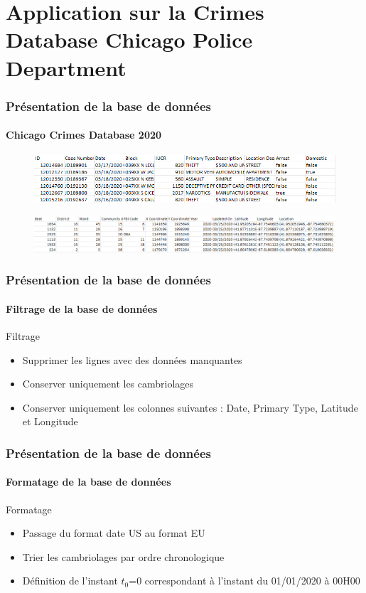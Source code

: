 \section[Pratique]{Application sur la Crimes Database Chicago Police Department}

\begin{frame}
	\frametitle{Présentation de la base de données}
	\framesubtitle{Chicago Crimes Database 2020}
		\begin{figure}
			    \centering
				\includegraphics[width=1.0\linewidth]{figures/database.png}
			
		\end{figure}
            \begin{figure}
			    \centering
				\includegraphics[width=1.0\linewidth]{figures/database2.png}
			
		\end{figure}
\end{frame}

\begin{frame}
	\frametitle{Présentation de la base de données}
	\framesubtitle{Filtrage de la base de données}
 \begin{block}{Filtrage}
    \begin{itemize}
            \item Supprimer les lignes avec des données manquantes
            \item Conserver uniquement les cambriolages
            \item Conserver uniquement les colonnes suivantes : Date, Primary Type, Latitude et Longitude
        \end{itemize}

    \end{block}
\end{frame}

\begin{frame}
	\frametitle{Présentation de la base de données}
	\framesubtitle{Formatage de la base de données}
 \begin{block}{Formatage}
    \begin{itemize}
            \item Passage du format date US au format EU
            \item Trier les cambriolages par ordre chronologique
            \item Définition de l'instant $t_0$=0 correspondant à l'instant du 01/01/2020 à 00H00
        \end{itemize}

    \end{block}
\end{frame}

